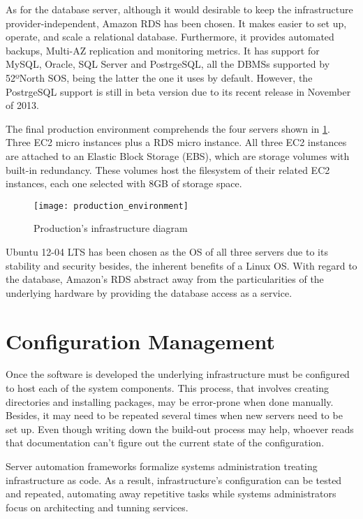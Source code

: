 As for the database server, although it would desirable to keep the infrastructure provider-independent, Amazon RDS has been chosen. It makes easier to set up, operate, and scale a relational database. Furthermore, it provides automated backups, Multi-AZ replication and monitoring metrics. It has support for MySQL, Oracle, SQL Server and PostrgeSQL, all the DBMSs supported by 52ºNorth SOS, being the latter the one it uses by default. However, the PostrgeSQL support is still in beta version due to its recent release in November of 2013.

The final production environment comprehends the four servers shown in \ref{fig:production_environment}. Three EC2 micro instances plus a RDS micro instance. All three EC2 instances are attached to an Elastic Block Storage (EBS), which are storage volumes with built-in redundancy. These volumes host the filesystem of their related EC2 instances, each one selected with 8GB of storage space.

\begin{figure}
  \centering
  \texttt{[image: production\_environment]}
  \caption{Production's infrastructure diagram}
  \label{fig:production_environment}
\end{figure}

Ubuntu 12-04 LTS has been chosen as the OS of all three servers due to its stability and security besides, the inherent benefits of a Linux OS. With regard to the database, Amazon's RDS abstract away from the particularities of the underlying hardware by providing the database access as a service.

\section{Configuration Management}

Once the software is developed the underlying infrastructure must be configured to host each of the system components. This process, that involves creating directories and installing packages, may be error-prone when done manually. Besides, it may need to be repeated several times when new servers need to be set up. Even though writing down the build-out process may help, whoever reads that documentation can't figure out the current state of the configuration.

Server automation frameworks formalize systems administration treating infrastructure as code. As a result, infrastructure's configuration can be tested and repeated, automating away repetitive tasks while systems administrators focus on architecting and tunning services.

